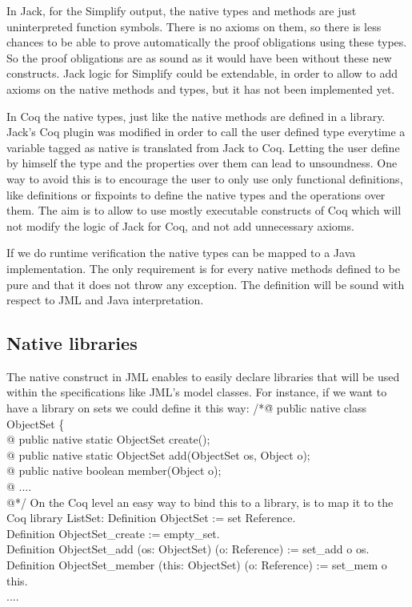 In Jack, for the Simplify output, the native types and methods are just uninterpreted function
symbols. There is no axioms on them,
 so there is less chances to be able to  prove automatically the proof obligations 
using these types. So the proof obligations are as sound as it would have been without these
new constructs. Jack logic for Simplify could be extendable, in order to allow to add axioms on the
native methods and types, but it has not been implemented yet.

In Coq the native types, just like the native methods are defined in a library.
Jack's Coq plugin was modified in order to call the user defined type every\-time  a variable tagged as 
native is translated from Jack to Coq. Letting the user define by himself the type and the properties 
over them can lead to unsoundness. One way to avoid this is to encourage the user to only use only 
functional definitions, like definitions or fixpoints to define the native types 
and the operations over them. 
 The aim is to allow to use mostly executable 
constructs of Coq which will not modify the logic of Jack for Coq, and not add
unnecessary axioms.

If we do runtime verification the native types can be mapped to a Java implementation. The only 
requirement is for every native methods defined to be pure and that it does not throw any exception. 
The definition will be sound with respect to JML and Java interpretation.
\subsection{Native libraries}
The native construct in JML enables to easily declare libraries 
that will be used within the specifications like JML's model classes. 
For instance, if we want to have a library on sets we could define it this way:
\btab
/*\=@ pub\=lic native class ObjectSet \{\+\\
  @\> public native static ObjectSet create();\\
   @\> public native static ObjectSet add(ObjectSet os, Object o);\\
   @\> public native boolean member(Object o);\\
   @ ....\\
   @*/
\etab
On the Coq level an easy way to bind this to a library, is to map it to the Coq library ListSet:
\btab
Definition ObjectSet := set Reference. \\
Definition ObjectSet\_create := empty\_set.\\
Definition ObjectSet\_add (os: ObjectSet) (o: Reference) :=  set\_add o os.\\
 Definition ObjectSet\_member (this: ObjectSet) (o: Reference) := set\_mem o this.\\
 ....
\etab

